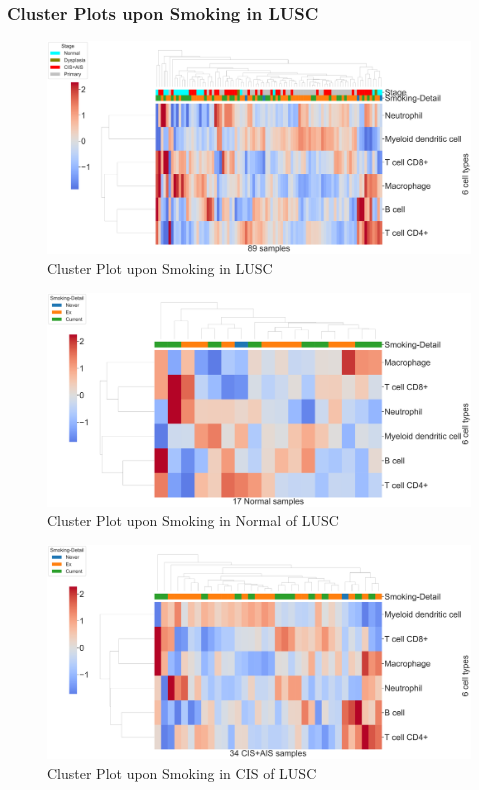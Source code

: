\documentclass{beamer}
\begin{document}
    \begin{frame}[allowframebreaks]
        \frametitle{Cluster Plots upon Smoking in LUSC}

        \begin{figure}
            \includegraphics[width=0.9 \linewidth]{figures/TIMER/Clustermap/STAR.FPKM.SQC.Smoking/TIMER-All.pdf}
            \caption{Cluster Plot upon Smoking in LUSC}
        \end{figure}

        \begin{figure}
            \includegraphics[width=0.9 \linewidth]{figures/TIMER/Clustermap/STAR.FPKM.SQC.Smoking/TIMER-Normal.pdf}
            \caption{Cluster Plot upon Smoking in Normal of LUSC}
        \end{figure}

        \begin{figure}
            \includegraphics[width=0.9 \linewidth]{figures/TIMER/Clustermap/STAR.FPKM.SQC.Smoking/TIMER-CIS+AIS.pdf}
            \caption{Cluster Plot upon Smoking in CIS of LUSC}
        \end{figure}


\end{frame}
\end{document}
